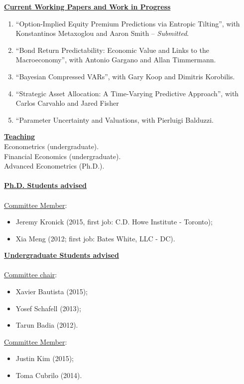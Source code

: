 \documentclass[12pt]{article}
\begin{document}
\underline{\textbf{Current Working Papers and Work in Progress}}
\begin{enumerate}
	\setcounter{enumi}{\theenumTemp}
	\item ``Option-Implied Equity Premium Predictions via Entropic Tilting'', with Konstantinos Metaxoglou  and Aaron Smith -- \textit{Submitted}.
	\item ``Bond Return Predictability: Economic Value and Links to the Macroeconomy'', with Antonio Gargano and Allan Timmermann.
	\item ``Bayesian Compressed VARs'', with Gary Koop and Dimitris Korobilis.
	\item ``Strategic Asset Allocation: A Time-Varying Predictive Approach'', with Carlos Carvahlo and Jared Fisher 
	\item ``Parameter Uncertainty and Valuations, with Pierluigi Balduzzi.
	
\end{enumerate}

\underline{\textbf{Teaching}}\\
Econometrics (undergraduate).\\
Financial Economics (undergraduate). \\
Advanced Econometrics (Ph.D.). \\ \\
\underline{\textbf{Ph.D. Students advised}} \\ \\
\underline{Committee Member}: 
\begin{itemize}
	\item Jeremy Kronick (2015, first job: C.D. Howe Institute - Toronto);
	\item Xia Meng (2012; first job: Bates White, LLC - DC). 
\end{itemize}
\underline{\textbf{Undergraduate Students advised}} \\ \\
\underline{Committee chair}: 
\begin{itemize}
	\item Xavier Bautista (2015);
	\item Yosef Schafell (2013);
	\item Tarun Badia (2012). 
\end{itemize}
\underline{Committee Member}: 
\begin{itemize}
	\item Justin Kim (2015);
	\item Toma Cubrilo (2014).
\end{itemize}
\end{document}
